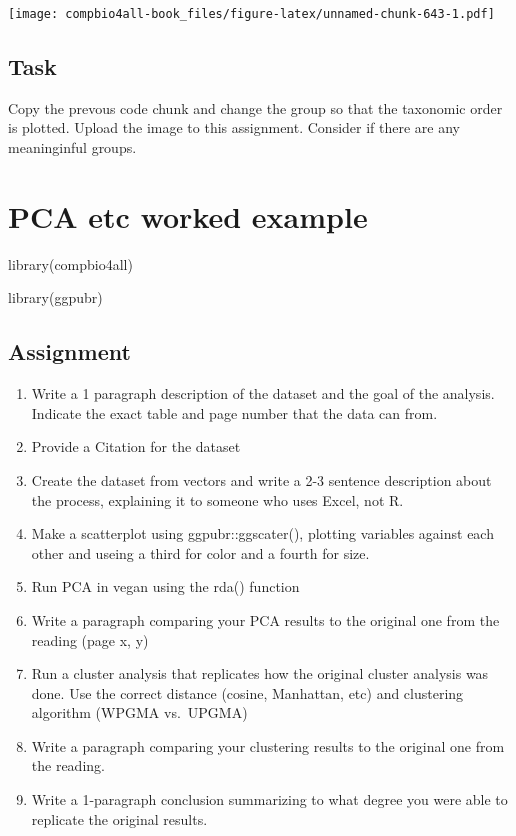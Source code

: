 \documentclass[
]{book}
\newenvironment{Shaded}{\begin{snugshade}}{\end{snugshade}}
\newcommand{\FunctionTok}[1]{\textcolor[rgb]{0.00,0.00,0.00}{#1}}
\newcommand{\NormalTok}[1]{#1}
\providecommand{\tightlist}{%
  \setlength{\itemsep}{0pt}\setlength{\parskip}{0pt}}
\begin{document}
\texttt{[image: compbio4all-book\_files/figure-latex/unnamed-chunk-643-1.pdf]}

\hypertarget{task-4}{%
\section{Task}\label{task-4}}

Copy the prevous code chunk and change the group so that the taxonomic order is plotted. Upload the image to this assignment. Consider if there are any meaninginful groups.

\hypertarget{pca-etc-worked-example}{%
\chapter{PCA etc worked example}\label{pca-etc-worked-example}}

\begin{Shaded}
\begin{Highlighting}[]
\FunctionTok{library}\NormalTok{(compbio4all)}

\FunctionTok{library}\NormalTok{(ggpubr)}
\end{Highlighting}
\end{Shaded}

\hypertarget{assignment}{%
\section{Assignment}\label{assignment}}

\begin{enumerate}
\def\labelenumi{\arabic{enumi}.}
\tightlist
\item
  Write a 1 paragraph description of the dataset and the goal of the analysis. Indicate the exact table and page number that the data can from.
\item
  Provide a Citation for the dataset
\item
  Create the dataset from vectors and write a 2-3 sentence description about the process, explaining it to someone who uses Excel, not R.
\item
  Make a scatterplot using ggpubr::ggscater(), plotting variables against each other and useing a third for color and a fourth for size.
\item
  Run PCA in vegan using the rda() function
\item
  Write a paragraph comparing your PCA results to the original one from the reading (page x, y)
\item
  Run a cluster analysis that replicates how the original cluster analysis was done. Use the correct distance (cosine, Manhattan, etc) and clustering algorithm (WPGMA vs.~UPGMA)
\item
  Write a paragraph comparing your clustering results to the original one from the reading.
\item
  Write a 1-paragraph conclusion summarizing to what degree you were able to replicate the original results.
\end{enumerate}
\end{document}
